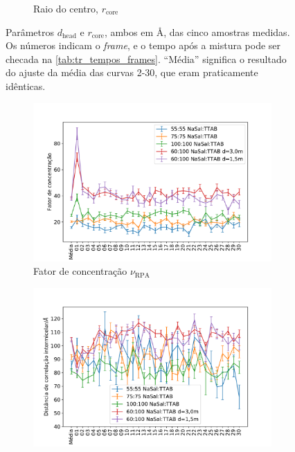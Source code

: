 \begin{figure}
\begin{subfigure}[t]{0.5\textwidth}
			\caption{Raio do centro, \(r_{\mathrm{core}}\)}
			\label{fig:param_radcore}
		\end{subfigure}
		\caption{Parâmetros \(d_{\mathrm{head}}\) e \(r_{\mathrm{core}}\), ambos em \AA, das cinco amostras medidas. Os números indicam o \emph{frame}, e o tempo após a mistura pode ser checada na \autoref{tab:tr_tempos_frames}. ``Média'' significa o resultado do ajuste da média das curvas 2-30, que eram praticamente idênticas.}
		\label{fig:params_dhead_radcore}
	\end{figure} 

	\begin{figure}
		\begin{subfigure}[t]{0.5\textwidth}
			\centering
			\includegraphics[width=\textwidth]{imagens/saxs/param_nu_rpa}
			\caption{Fator de concentração \(\nu_{\mathrm{RPA}}\)}
			\label{fig:param_nurpa}
		\end{subfigure} %
		\begin{subfigure}[t]{0.5\textwidth}
			\centering
			\includegraphics[width=\textwidth]{imagens/saxs/param_d_cq}

\end{subfigure}
\end{figure}
